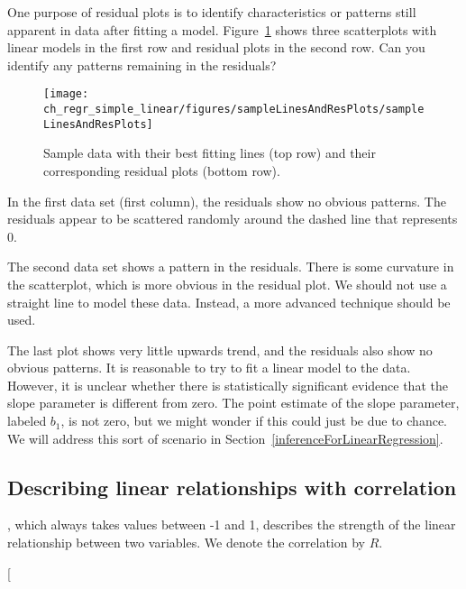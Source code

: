 \begin{example}{One purpose of residual plots is to identify characteristics or patterns still apparent in data after fitting a model. Figure~\ref{sampleLinesAndResPlots} shows three scatterplots with linear models in the first row and residual plots in the second row. Can you identify any patterns remaining in the residuals?}

\begin{figure}
   \centering
   \texttt{[image: ch\_regr\_simple\_linear/figures/sampleLinesAndResPlots/sampleLinesAndResPlots]}
   \caption{Sample data with their best fitting lines (top row) and their corresponding residual plots (bottom row).}
   \label{sampleLinesAndResPlots}
\end{figure}
In the first data set (first column), the residuals show no obvious patterns. The residuals appear to be scattered randomly around the dashed line that represents 0.

The second data set shows a pattern in the residuals. There is some curvature in the scatterplot, which is more obvious in the residual plot. We should not use a straight line to model these data. Instead, a more advanced technique should be used.

The last plot shows very little upwards trend, and the residuals also show no obvious patterns. It is reasonable to try to fit a linear model to the data. However, it is unclear whether there is statistically significant evidence that the slope parameter is different from zero. The point estimate of the slope parameter, labeled $b_1$, is not zero, but we might wonder if this could just be due to chance. We will address this sort of scenario in Section~\ref{inferenceForLinearRegression}.
\end{example}


\subsection{Describing linear relationships with correlation}


\begin{termBox}{
, which always takes values between -1 and 1, describes the strength of the linear relationship between two variables. We denote the correlation by $R$.}
\end{termBox}\marginpar[\raggedright\vspace{-11.5mm}

